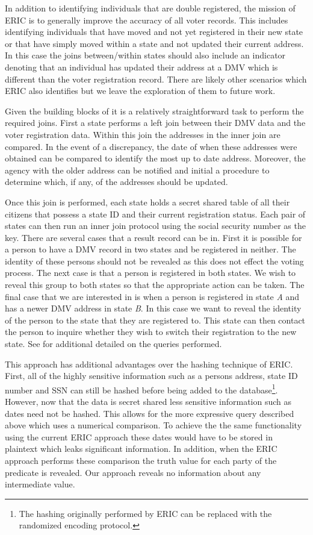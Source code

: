 In addition to identifying individuals that are double registered, the mission of ERIC is to generally improve the accuracy of all voter records. This includes identifying individuals that have moved and not yet registered in their new state or that have simply moved within a state and not updated their current address. In this case the joins between/within states should also include an indicator denoting that an individual has updated their address at a DMV which is different than the voter registration record. There are likely other scenarios which ERIC also identifies but we leave the exploration of them to future work.

Given the building blocks of  it is a relatively straightforward task to perform the required joins. First a state performs a left join between their DMV data and the voter registration data. Within this join the addresses in the inner join are compared. In the event of a discrepancy, the date of when these addresses were obtained can be compared to identify the most up to date address. Moreover, the agency with the older address can be notified and initial a procedure to determine which, if any, of the addresses should be updated. 


Once this join is performed, each state holds a secret shared table of all their citizens that possess a state ID and their current registration status. Each pair of states can then run an inner join protocol using the social security number as the key. There are several cases that a result record can be in. First it is possible for a person to have a DMV record in two states and be registered in neither. The identity of these persons should not be revealed as this does not effect the voting process. The next case is that a person is registered in both states. We wish to reveal this group to both states so that the appropriate action can be taken. The final case that we are interested in is when a person is registered in state \emph{A} and has a newer DMV address in state \emph{B}. In this case we want to reveal the identity of the person to the state that they are registered to. This state can then contact the person to inquire whether they wish to switch their registration to the new state. 
See  for additional detailed on the queries performed.



This approach has additional advantages over the hashing technique of ERIC. First, all of the highly sensitive information such as a persons address, state ID number and SSN can still be hashed before being added to the database\footnote{The hashing originally performed by ERIC can be replaced with the randomized encoding protocol.}. However, now that the data is secret shared less sensitive information such as dates need not be hashed. This allows for the more expressive query described above which uses a numerical comparison. To achieve the the same functionality using the current ERIC approach these dates would have to be stored in plaintext which leaks significant information. In addition, when the ERIC approach performs these comparison the truth value for each party of the predicate is revealed. Our approach reveals no information about any intermediate value. 

